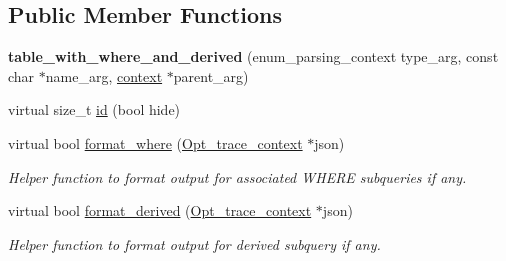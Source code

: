 \subsection*{Public Member Functions}
\begin{DoxyCompactItemize}
\item 
\mbox{\label{classopt__explain__json__namespace_1_1table__with__where__and__derived_a5fe59d371f6c3d298dbbde1a6b107029}} 
{\bfseries table\+\_\+with\+\_\+where\+\_\+and\+\_\+derived} (enum\+\_\+parsing\+\_\+context type\+\_\+arg, const char $\ast$name\+\_\+arg, \mbox{\hyperlink{classopt__explain__json__namespace_1_1context}{context}} $\ast$parent\+\_\+arg)
\item 
virtual size\+\_\+t \mbox{\hyperlink{classopt__explain__json__namespace_1_1table__with__where__and__derived_ab71bf926210b34494e172ff100cc348b}{id}} (bool hide)
\item 
\mbox{\label{classopt__explain__json__namespace_1_1table__with__where__and__derived_ae4b73979e87652db40dcc0bec035ed00}} 
virtual bool \mbox{\hyperlink{classopt__explain__json__namespace_1_1table__with__where__and__derived_ae4b73979e87652db40dcc0bec035ed00}{format\+\_\+where}} (\mbox{\hyperlink{classOpt__trace__context}{Opt\+\_\+trace\+\_\+context}} $\ast$json)
\begin{DoxyCompactList}\small\item\em Helper function to format output for associated W\+H\+E\+RE subqueries if any. \end{DoxyCompactList}\item 
\mbox{\label{classopt__explain__json__namespace_1_1table__with__where__and__derived_afe63391c4967adf271f0d410442a0c0b}} 
virtual bool \mbox{\hyperlink{classopt__explain__json__namespace_1_1table__with__where__and__derived_afe63391c4967adf271f0d410442a0c0b}{format\+\_\+derived}} (\mbox{\hyperlink{classOpt__trace__context}{Opt\+\_\+trace\+\_\+context}} $\ast$json)
\begin{DoxyCompactList}\small\item\em Helper function to format output for derived subquery if any. \end{DoxyCompactList}\end{DoxyCompactItemize}
